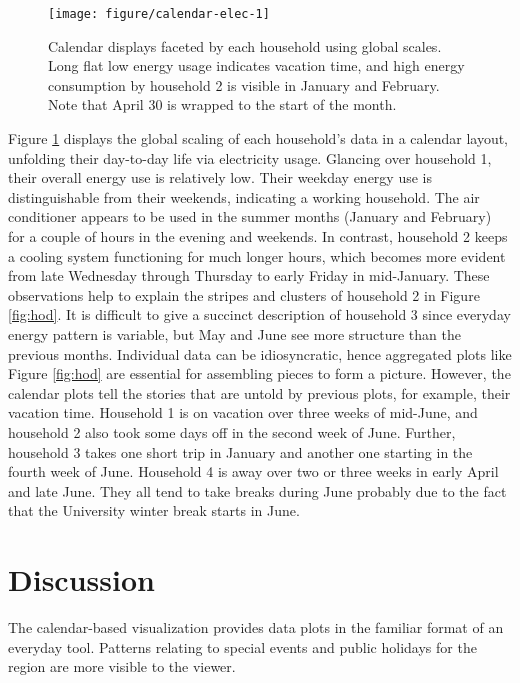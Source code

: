 \documentclass[12pt]{article}
\begin{document}
\begin{figure}

{\centering \texttt{[image: figure/calendar-elec-1]} 

}

\caption{Calendar displays faceted by each household using global scales. Long flat low energy usage indicates vacation time, and high energy consumption by household 2 is visible in January and February. Note that April 30 is wrapped to the start of the month.}\label{fig:calendar-elec}
\end{figure}



Figure \ref{fig:calendar-elec} displays the global scaling of each household's data in a calendar layout, unfolding their day-to-day life via electricity usage. Glancing over household 1, their overall energy use is relatively low. Their weekday energy use is distinguishable from their weekends, indicating a working household. The air conditioner appears to be used in the summer months (January and February) for a couple of hours in the evening and weekends. In contrast, household 2 keeps a cooling system functioning for much longer hours, which becomes more evident from late Wednesday through Thursday to early Friday in mid-January. These observations help to explain the stripes and clusters of household 2 in Figure \ref{fig:hod}. It is difficult to give a succinct description of household 3 since everyday energy pattern is variable, but May and June see more structure than the previous months. Individual data can be idiosyncratic, hence aggregated plots like Figure \ref{fig:hod} are essential for assembling pieces to form a picture. However, the calendar plots tell the stories that are untold by previous plots, for example, their vacation time. Household 1 is on vacation over three weeks of mid-June, and household 2 also took some days off in the second week of June. Further, household 3 takes one short trip in January and another one starting in the fourth week of June. Household 4 is away over two or three weeks in early April and late June. They all tend to take breaks during June probably due to the fact that the University winter break starts in June.

\hypertarget{sec:discussion}{%
\section{Discussion}\label{sec:discussion}}

The calendar-based visualization provides data plots in the familiar format of an everyday tool. Patterns relating to special events and public holidays for the region are more visible to the viewer.
\end{document}
